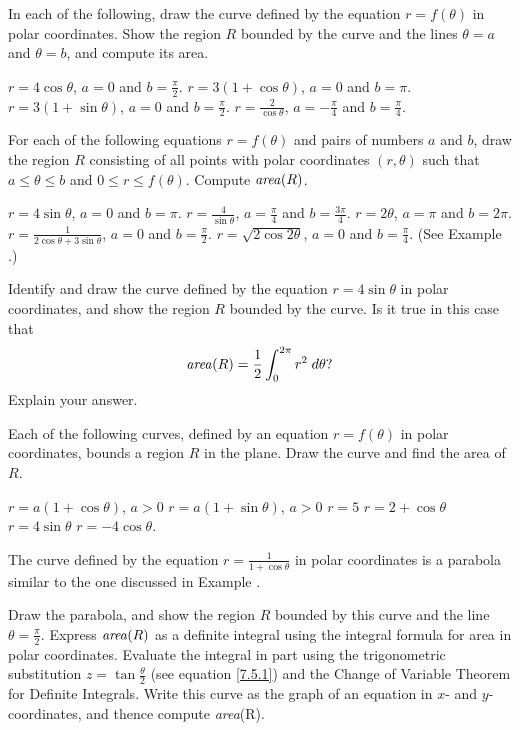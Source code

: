 \begin{exercises}

In each of the following, draw the curve defined by the
equation $r = f(\theta)$ in polar coordinates.
Show the region $R$ bounded by the curve and the
lines $\theta = a$ and $\theta = b$, and compute
its area.
\begin{exenum}
\x
$r=4\cos \theta$, $a=0$ and $b=\frac\pi2$.
\x
$r=3(1+\cos\theta)$, $a=0$ and $b=\pi$.
\x
$r=3(1+\sin\theta)$, $a=0$ and $b=\frac\pi2$.
\x
$r=\frac2{\cos\theta}$, $a=-\frac\pi4$ and $b=\frac\pi4$.
\end{exenum}

For each of the following equations $r=f(\theta)$
and pairs of numbers $a$ and $b$,
draw the region $R$ consisting of all points
with polar coordinates $(r,\theta)$
such that $a\leq\theta\leq b$ and
$0\leq r\leq f(\theta)$.
Compute $\mbox{\emph{area}}(R)$.
\begin{exenum}
\x
$r=4\sin\theta$, $a=0$ and $b=\pi$.
\x
$r=\frac4{\sin\theta}$, $a=\frac\pi4$ and $b=\frac{3\pi}4$.
\x
$r=2\theta$, $a=\pi$ and $b=2\pi$.
\x
$r=\frac1{2\cos\theta+3\sin\theta}$,
$a=0$ and $b=\frac\pi2$.
\x
$r=\sqrt{2\cos2\theta}$, $a=0$ and $b=\frac\pi4$.
(See Example .)
\end{exenum}

Identify and draw the curve defined by the equation
$r=4\sin\theta$ in polar coordinates,
and show the region $R$ bounded by the curve.
Is it true in this case that
\[
\mbox{\emph{area}}(R) = \frac12
\int_0^{2\pi} r^2 \; d\theta
?
\]
Explain your answer.

Each of the following curves, defined by an equation
$r=f(\theta)$ in polar coordinates,
bounds a region $R$ in the plane.
Draw the curve and find the area of $R$.
\begin{exenum}
\x
$r=a(1+\cos\theta)$, $a>0$
\x
$r=a(1+\sin\theta)$, $a>0$
\x
$r=5$
\x
$r=2+\cos\theta$
\x
$r=4\sin\theta$
\x
$r=-4\cos\theta$.
\end{exenum}

The curve defined by the equation
$r=\frac1{1+\cos\theta}$ in polar coordinates
is a parabola similar to the one discussed in 
Example .
\begin{exenum}
\x
Draw the parabola, and show the region $R$
bounded by this curve and the line
$\theta=\frac\pi2$.
\x
{}
Express $\mbox{\emph{area}}(R)$ as a definite
integral using the integral formula for area
in polar coordinates.
\x
Evaluate the integral in part  using the
trigonometric substitution $z=\tan \frac\theta2$ (see
equation \eqref{7.5.1}) and the Change of Variable
Theorem for Definite Integrals.
\x
Write this curve as the graph of an equation
in $x$- and $y$-coordinates,
and thence compute \emph{area}(R).
\end{exenum}


\end{exercises}
